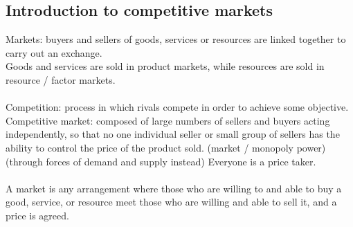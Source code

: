 \subsection{Introduction to competitive markets}
Markets: buyers and sellers of goods, services or resources are linked together to carry out an exchange.\\
Goods and services are sold in product markets, while resources are sold in resource / factor markets.\\\\
Competition: process in which rivals compete in order to achieve some objective.\\
Competitive market: composed of large numbers of sellers and buyers acting independently, so that no one individual seller or small group of sellers has the ability to control the price of the product sold. (market / monopoly power) (through forces of demand and supply instead) Everyone is a price taker.\\\\
A market is any arrangement where those who are willing to and able to buy a good, service, or resource meet those who are willing and able to sell it, and a price is agreed.
